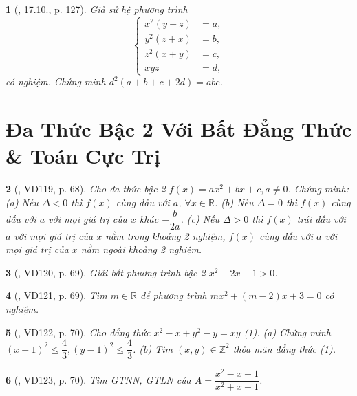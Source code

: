 \documentclass{article}
\newtheorem{baitoan}{}
\begin{document}
\begin{baitoan}[\cite{TLCT_THCS_Toan_9_dai_so}, 17.10., p. 127]
	Giả sử hệ phương trình
	\begin{equation*}
		\left\{\begin{split}
			x^2(y + z) &= a,\\
			y^2(z + x) &= b,\\
			z^2(x + y) &= c,\\
			xyz &= d,
		\end{split}\right.
	\end{equation*}
	có nghiệm. Chứng minh $d^2(a + b + c + 2d) = abc$.
\end{baitoan}


\section{Đa Thức Bậc 2 Với Bất Đẳng Thức \& Toán Cực Trị}

\begin{baitoan}[\cite{Binh_Toan_9_tap_2}, VD119, p. 68]
	Cho đa thức bậc 2 $f(x) = ax^2 + bx + c,a\ne0$. Chứng minh: (a) Nếu $\Delta < 0$ thì $f(x)$ cùng dấu với $a$, $\forall x\in\mathbb{R}$. (b) Nếu $\Delta = 0$ thì $f(x)$ cùng dấu với $a$ với mọi giá trị của $x$ khác $-\dfrac{b}{2a}$. (c) Nếu $\Delta > 0$ thì $f(x)$ trái dấu với $a$ với mọi giá trị của $x$ nằm trong khoảng 2 nghiệm, $f(x)$ cùng dấu với $a$ với mọi giá trị của $x$ nằm ngoài khoảng 2 nghiệm.
\end{baitoan}

\begin{baitoan}[\cite{Binh_Toan_9_tap_2}, VD120, p. 69]
	Giải bất phương trình bậc 2 $x^2 - 2x - 1 > 0$.
\end{baitoan}

\begin{baitoan}[\cite{Binh_Toan_9_tap_2}, VD121, p. 69]
	Tìm $m\in\mathbb{R}$ để phương trình $mx^2 + (m - 2)x + 3 = 0$ có nghiệm.
\end{baitoan}

\begin{baitoan}[\cite{Binh_Toan_9_tap_2}, VD122, p. 70]
	Cho đẳng thức $x^2 - x + y^2 - y = xy$ {\rm(1)}. (a) Chứng minh $(x - 1)^2\le\dfrac{4}{3},(y - 1)^2\le\dfrac{4}{3}$. (b) Tìm $(x,y)\in\mathbb{Z}^2$ thỏa mãn đẳng thức {\rm(1)}.
\end{baitoan}

\begin{baitoan}[\cite{Binh_Toan_9_tap_2}, VD123, p. 70]
	Tìm {\rm GTNN, GTLN} của $A = \dfrac{x^2 - x + 1}{x^2 + x + 1}$.
\end{baitoan}
\end{document}
